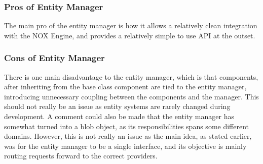 \subsubsection{Pros of Entity Manager}
The main pro of the entity manager is how it allows a relatively clean integration
with the NOX Engine, and provides a relatively simple to use API at the outset.

\subsubsection{Cons of Entity Manager}
There is one main disadvantage to the entity manager, which is that components,
after inheriting from the base class component are tied to the entity manager, introducing
unnecessary coupling between the components and the manager. This should not
really be an issue as entity systems are rarely changed during development.
A comment could also be made that the entity manager has somewhat turned into a blob object,
as its responsibilities spans some different domains. However, this is not really an issue
as the main idea, as stated earlier, was for the entity manager to be a single interface,
and its objective is mainly routing requests forward to the correct providers.
